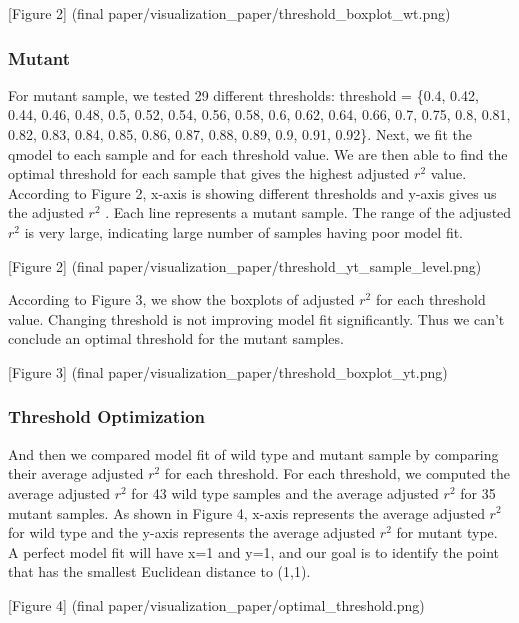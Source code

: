\documentclass[10pt,letterpaper]{article}
\begin{document}
{[}Figure 2{]} (final
paper/visualization\_paper/threshold\_boxplot\_wt.png)

\hypertarget{mutant}{%
\subsubsection{Mutant}\label{mutant}}

For mutant sample, we tested 29 different thresholds: threshold = \{0.4,
0.42, 0.44, 0.46, 0.48, 0.5, 0.52, 0.54, 0.56, 0.58, 0.6, 0.62, 0.64,
0.66, 0.7, 0.75, 0.8, 0.81, 0.82, 0.83, 0.84, 0.85, 0.86, 0.87, 0.88,
0.89, 0.9, 0.91, 0.92\}. Next, we fit the qmodel to each sample and for
each threshold value. We are then able to find the optimal threshold for
each sample that gives the highest adjusted \(r^2\) value. According to
Figure 2, x-axis is showing different thresholds and y-axis gives us the
adjusted \(r^2\) . Each line represents a mutant sample. The range of
the adjusted \(r^2\) is very large, indicating large number of samples
having poor model fit.

{[}Figure 2{]} (final
paper/visualization\_paper/threshold\_yt\_sample\_level.png)

According to Figure 3, we show the boxplots of adjusted \(r^2\) for each
threshold value. Changing threshold is not improving model fit
significantly. Thus we can't conclude an optimal threshold for the
mutant samples.

{[}Figure 3{]} (final
paper/visualization\_paper/threshold\_boxplot\_yt.png)

\hypertarget{threshold-optimization}{%
\subsubsection{Threshold Optimization}\label{threshold-optimization}}

And then we compared model fit of wild type and mutant sample by
comparing their average adjusted \(r^2\) for each threshold. For each
threshold, we computed the average adjusted \(r^2\) for 43 wild type
samples and the average adjusted \(r^2\) for 35 mutant samples. As shown
in Figure 4, x-axis represents the average adjusted \(r^2\) for wild
type and the y-axis represents the average adjusted \(r^2\) for mutant
type. A perfect model fit will have x=1 and y=1, and our goal is to
identify the point that has the smallest Euclidean distance to (1,1).

{[}Figure 4{]} (final paper/visualization\_paper/optimal\_threshold.png)
\end{document}
